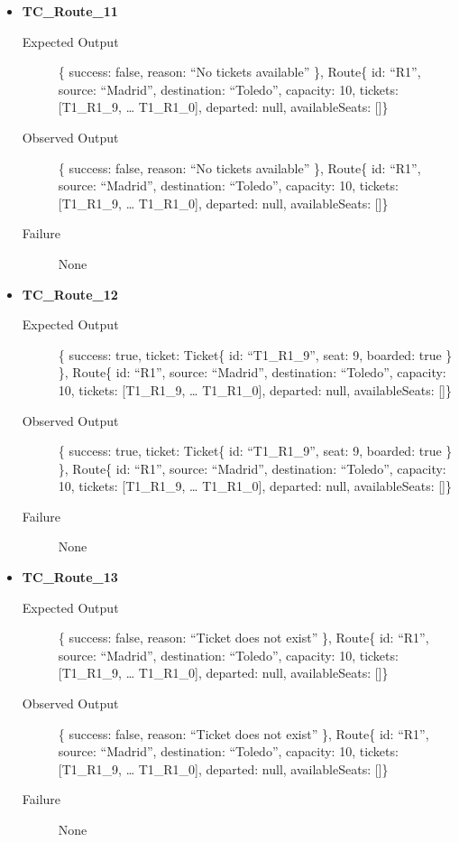 \documentclass[11pt]{article}
\begin{document}
\begin{itemize}
\item \textbf{TC\_Route\_11}
\begin{description}
\item[{Expected Output}] \{ success: false, reason: “No tickets available” \},
Route\{ id: “R1”, source: “Madrid”, destination: “Toledo”, capacity: 10,  tickets: [T1\_R1\_9, … T1\_R1\_0], departed: null, availableSeats: []\}
\item[{Observed Output}] \{ success: false, reason: “No tickets available” \},
Route\{ id: “R1”, source: “Madrid”, destination: “Toledo”, capacity: 10,  tickets: [T1\_R1\_9, … T1\_R1\_0], departed: null, availableSeats: []\}
\item[{Failure}] None
\end{description}

\item \textbf{TC\_Route\_12}
\begin{description}
\item[{Expected Output}] \{ success: true, ticket:  Ticket\{ id: “T1\_R1\_9”, seat: 9, boarded: true \} \},
Route\{ id: “R1”, source: “Madrid”, destination: “Toledo”, capacity: 10,  tickets: [T1\_R1\_9, … T1\_R1\_0], departed: null, availableSeats: []\}
\item[{Observed Output}] \{ success: true, ticket:  Ticket\{ id: “T1\_R1\_9”, seat: 9, boarded: true \} \},
Route\{ id: “R1”, source: “Madrid”, destination: “Toledo”, capacity: 10,  tickets: [T1\_R1\_9, … T1\_R1\_0], departed: null, availableSeats: []\}
\item[{Failure}] None
\end{description}

\item \textbf{TC\_Route\_13}
\begin{description}
\item[{Expected Output}] \{ success: false, reason: “Ticket does not exist” \},
Route\{ id: “R1”, source: “Madrid”, destination: “Toledo”, capacity: 10,  tickets: [T1\_R1\_9, … T1\_R1\_0], departed: null, availableSeats: []\}
\item[{Observed Output}] \{ success: false, reason: “Ticket does not exist” \},
Route\{ id: “R1”, source: “Madrid”, destination: “Toledo”, capacity: 10,  tickets: [T1\_R1\_9, … T1\_R1\_0], departed: null, availableSeats: []\}
\item[{Failure}] None
\end{description}


\end{itemize}
\end{document}

